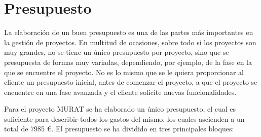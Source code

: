 \section{Presupuesto}
La elaboración de un buen presupuesto es una de las partes más importantes en la gestión de proyectos. En multitud de ocasiones, sobre todo si los proyectos son muy grandes, no se tiene un único presupuesto por proyecto, sino que se presupuesta de formas muy variadas, dependiendo, por ejemplo, de la fase en la que se encuentre el proyecto. No es lo mismo que se le quiera proporcionar al cliente un presupuesto inicial, antes de comenzar el proyecto, a que el proyecto se encuentre en una fase avanzada y el cliente solicite nuevas funcionalidades.

Para el proyecto MURAT se ha elaborado un único presupuesto, el cual es suficiente para describir todos los gastos del mismo, los cuales ascienden a un total de 7985 \euro. El presupuesto se ha dividido en tres principales bloques:
